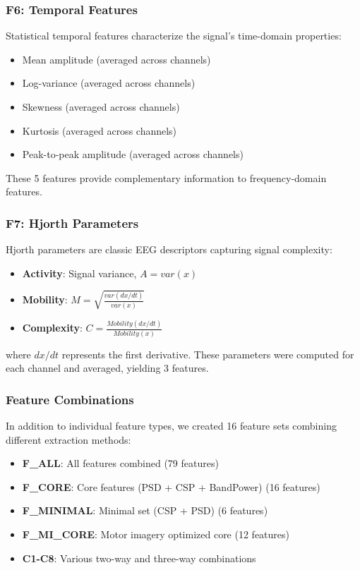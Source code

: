 \documentclass[conference]{IEEEtran}
\begin{document}
\subsubsection{F6: Temporal Features}
Statistical temporal features characterize the signal's time-domain properties:
\begin{itemize}
    \item Mean amplitude (averaged across channels)
    \item Log-variance (averaged across channels)
    \item Skewness (averaged across channels)
    \item Kurtosis (averaged across channels)
    \item Peak-to-peak amplitude (averaged across channels)
\end{itemize}

These 5 features provide complementary information to frequency-domain features.

\subsubsection{F7: Hjorth Parameters}
Hjorth parameters are classic EEG descriptors capturing signal complexity:

\begin{itemize}
    \item \textbf{Activity}: Signal variance, $A = var(x)$
    \item \textbf{Mobility}: $M = \sqrt{\frac{var(dx/dt)}{var(x)}}$
    \item \textbf{Complexity}: $C = \frac{Mobility(dx/dt)}{Mobility(x)}$
\end{itemize}

where $dx/dt$ represents the first derivative. These parameters were computed for each channel and averaged, yielding 3 features.

\subsubsection{Feature Combinations}
In addition to individual feature types, we created 16 feature sets combining different extraction methods:

\begin{itemize}
    \item \textbf{F\_ALL}: All features combined (79 features)
    \item \textbf{F\_CORE}: Core features (PSD + CSP + BandPower) (16 features)
    \item \textbf{F\_MINIMAL}: Minimal set (CSP + PSD) (6 features)
    \item \textbf{F\_MI\_CORE}: Motor imagery optimized core (12 features)
    \item \textbf{C1-C8}: Various two-way and three-way combinations
\end{itemize}
\end{document}
